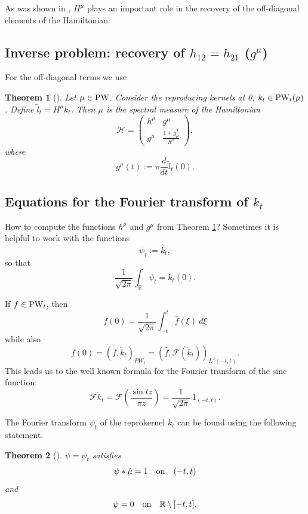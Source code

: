 \documentclass[11pt,twoside,reqno]{amsart}
\def\PW{\text{\rm PW}}
\def\ms{\bigskip}
\def\ms{\medskip}
\def\R{{\mathbb R}}
\def\FF{{\mathcal F}}
\def\HH{{\mathcal H}}
\def\g{\gamma}
\theoremstyle{plain}
\newtheorem{theorem}{Theorem}
\numberwithin{equation}{section}
\begin{document}
As was shown in \cite{etudes}, $H^\mu$ plays an important role in the recovery of the off-diagonal elements of the Hamiltonian:

\ms	\subsection{Inverse problem: recovery of $h_{12}=h_{21}$ ($g^\mu$)}
	
	For the off-diagonal terms we use

\begin{theorem}[\cite{etudes}] \label{t007} Let $\mu\in\PW$. Consider the reproducing kernels at 0, $k_t\in\PW_t(\mu)$. Define $\tilde l_t=H^\mu k_t$. Then $\mu$ is the spectral measure of the Hamiltonian
	$$\HH=\begin{pmatrix}h^\mu&g^\mu\\g^\mu&\frac{1+g^2_{\mu}}{h^\mu}\end{pmatrix},$$
	where
	$$g^\mu(t):=\pi\frac d{dt} \tilde l_t(0).$$
\end{theorem}

\ms\subsection{Equations for the Fourier transform of $k_t$}\label{secFt} How to compute the functions $h^\mu$ and $g^\mu$
from Theorem \ref{t007}? Sometimes  it is helpful to work with the functions
$$\psi_t:=\hat k_t,$$
so that
$$\frac1{\sqrt{2\pi}}\int_\R\psi_t=k_t(0).$$


If $f\in {\rm PW}_t$, then
$$f(0)=\frac1{\sqrt{2\pi}}\int_{-t}^t\hat f(\xi)~d\xi$$
while  also
$$ f(0)=(f, \mathring k_t)_{PW_t}=\left(\hat f,\FF(\mathring k_t)\right)_{L^2(-t,t)}.$$
This leads us to the well known formula for the Fourier transform of the sinc function:
$$\FF \mathring k_t =\FF\left(\frac{\sin tz}{\pi z}\right)
=  \frac1{\sqrt{2\pi}}~1_{(-t,t)}.$$

The Fourier transform $\psi_t$ of the reprokernel $k_t$ can be found using the following statement.

\begin{theorem}[\cite{etudes}] \label{tTT} $\psi=\psi_t$ satisfies
	\begin{equation}\psi\ast \hat\mu=1 \quad  {\rm on}\quad (-t,t)\label{eq002A}\end{equation}
	and
	$$\psi=0 \quad  {\rm on}\quad \R\setminus [-t,t].$$\end{theorem}
	
\end{document}
